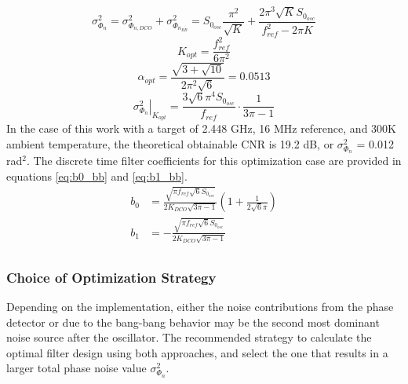 	\begin{equation}\label{eq:bb_osc_noise2}
		\sigma_{\Phi_{n}}^2 = \sigma_{\Phi_{n,DCO}}^2 + \sigma^2_{\Phi_{n_{BB}}} = S_{0_{osc}}\frac{\pi^2}{\sqrt{K}} + \frac{2\pi^3\sqrt{K}S_{0_{osc}}}{f_{ref}^2  - 2\pi K}
	\end{equation}
	\begin{equation} \label{eq:kopt_bb}
		K_{opt} = \frac{f_{ref}^2}{6\pi^2}
	\end{equation}
	\begin{equation} \label{eq:alpha_opt_bb}
		\alpha_{opt} = \frac{\sqrt{3+\sqrt{10}}}{2\pi^2\sqrt{6}} = 0.0513
	\end{equation}
	\begin{equation} \label{eq:pn_opt_bb}
		\left.\sigma_{\Phi_{n}}^2 \right|_{K_{opt}} = \frac{3\sqrt{6}\pi^4S_{0_{osc}}}{f_{ref}}\cdot\frac{1}{3\pi - 1}
	\end{equation}
	In the case of this work with a target of 2.448 GHz, 16 MHz reference, and 300K ambient temperature, the theoretical obtainable CNR is 19.2 dB, or $\sigma_{\Phi_{n}}^2$ = 0.012 rad$^2$. The discrete time filter coefficients for this optimization case are provided in equations \ref{eq:b0_bb} and \ref{eq:b1_bb}.
	\begin{align}
		b_0 &= \frac{\sqrt{\pi f_{ref}\sqrt{6}S_{0_{osc}}}}{2K_{DCO}\sqrt{3\pi-1}}\left( 1 + \frac{1}{2\sqrt{6}\pi} \right) \label{eq:b0_bb}\\
		b_1 &= -\frac{\sqrt{\pi f_{ref}\sqrt{6}S_{0_{osc}}}}{2K_{DCO}\sqrt{3\pi-1}}\label{eq:b1_bb}\\
	\end{align}

	\subsubsection{Choice of Optimization Strategy}
	Depending on the implementation, either the noise contributions from the phase detector or due to the bang-bang behavior may be the second most dominant noise source after the oscillator. The recommended strategy to calculate the optimal filter design using both approaches, and select the one that results in a larger total phase noise value $\sigma_{\Phi_{n}}^2$.






